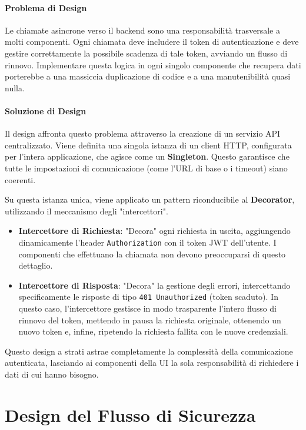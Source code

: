 \documentclass[12pt,a4paper,openright,twoside]{book}
\begin{document}
\paragraph{Problema di Design}
Le chiamate asincrone verso il backend sono una responsabilità trasversale a molti componenti. Ogni chiamata deve includere il token di autenticazione e deve gestire correttamente la possibile scadenza di tale token, avviando un flusso di rinnovo. Implementare questa logica in ogni singolo componente che recupera dati porterebbe a una massiccia duplicazione di codice e a una manutenibilità quasi nulla.

\paragraph{Soluzione di Design}
Il design affronta questo problema attraverso la creazione di un servizio API centralizzato. Viene definita una singola istanza di un client HTTP, configurata per l'intera applicazione, che agisce come un \textbf{Singleton}. Questo garantisce che tutte le impostazioni di comunicazione (come l'URL di base o i timeout) siano coerenti.

Su questa istanza unica, viene applicato un pattern riconducibile al \textbf{Decorator}, utilizzando il meccanismo degli "intercettori".
\begin{itemize}
    \item \textbf{Intercettore di Richiesta}: "Decora" ogni richiesta in uscita, aggiungendo dinamicamente l'header \texttt{Authorization} con il token JWT dell'utente. I componenti che effettuano la chiamata non devono preoccuparsi di questo dettaglio.
    \item \textbf{Intercettore di Risposta}: "Decora" la gestione degli errori, intercettando specificamente le risposte di tipo \texttt{401 Unauthorized} (token scaduto). In questo caso, l'intercettore gestisce in modo trasparente l'intero flusso di rinnovo del token, mettendo in pausa la richiesta originale, ottenendo un nuovo token e, infine, ripetendo la richiesta fallita con le nuove credenziali.
\end{itemize}
Questo design a strati astrae completamente la complessità della comunicazione autenticata, lasciando ai componenti della UI la sola responsabilità di richiedere i dati di cui hanno bisogno.

\section{Design del Flusso di Sicurezza}
\label{sec:design_security_flow}
\end{document}
